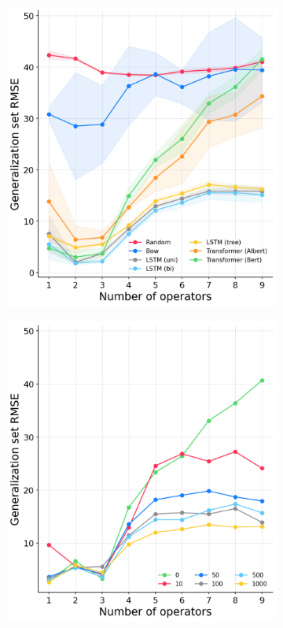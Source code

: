 \begin{figure}[htb!]
    \centering
    \begin{subfigure}[b]{7.52cm}
        \centering 
        \includegraphics[width=\textwidth]{images/productivity_v2.png}
        \caption{}
        \label{fig:productivity}
    \end{subfigure}
    \hfill
    \begin{subfigure}[b]{7.52cm}
        \centering 
        \includegraphics[width=\columnwidth]{images/productivity-exposition_v2.png}

\end{subfigure}
\end{figure}

